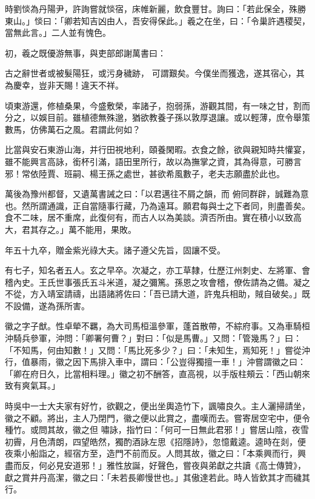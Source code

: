 \begin{pinyinscope}
 時劉惔為丹陽尹，許詢嘗就惔宿，床帷新麗，飲食豐甘。詢曰：「若此保全，殊勝東山。」惔曰：「卿若知吉凶由人，吾安得保此。」羲之在坐，曰：「令巢許遇稷契，當無此言。」二人並有愧色。



 初，羲之既優游無事，與吏部郎謝萬書曰：



 古之辭世者或被髮陽狂，或污身穢跡，
 可謂艱矣。今僕坐而獲逸，遂其宿心，其為慶幸，豈非天賜！違天不祥。



 頃東游還，修植桑果，今盛敷榮，率諸子，抱弱孫，游觀其間，有一味之甘，割而分之，以娛目前。雖植德無殊邈，猶欲教養子孫以敦厚退讓。或以輕薄，庶令舉策數馬，仿佛萬石之風。君謂此何如？



 比當與安石東游山海，并行田視地利，頤養閑暇。衣食之餘，欲與親知時共懽宴，雖不能興言高詠，銜杯引滿，語田里所行，故以為撫掌之資，其為得意，可勝言邪！常依陸賈、班嗣、楊王孫之處世，甚欲希風數子，老夫志願盡於此也。



 萬後為豫州都督，又遺萬書誡之曰：「以君邁往不屑之韻，而
 俯同群辟，誠難為意也。然所謂通識，正自當隨事行藏，乃為遠耳。願君每與士之下者同，則盡善矣。食不二味，居不重席，此復何有，而古人以為美談。濟否所由。實在積小以致高大，君其存之。」萬不能用，果敗。



 年五十九卒，贈金紫光祿大夫。諸子遵父先旨，固讓不受。



 有七子，知名者五人。玄之早卒。次凝之，亦工草隸，仕歷江州刺史、左將軍、會稽內史。王氏世事張氏五斗米道，凝之彌篤。孫恩之攻會稽，僚佐請為之備。凝之不從，方入靖室請禱，出語諸將佐曰：「吾已請大道，許鬼兵相助，賊自破矣。」既不設備，遂為孫所害。



 徽之字子猷。性卓犖不羈，為大司馬桓溫參軍，蓬首散帶，不綜府事。又為車騎桓沖騎兵參軍，沖問：「卿署何曹？」對曰：「似是馬曹。」又問：「管幾馬？」曰：「不知馬，何由知數！」又問：「馬比死多少？」曰：「未知生，焉知死！」嘗從沖行，值暴雨，徽之因下馬排入車中，謂曰：「公豈得獨擅一車！」沖嘗謂徽之曰：「卿在府日久，比當相料理。」徽之初不酬答，直高視，以手版柱頰云：「西山朝來致有爽氣耳。」



 時吳中一士大夫家有好竹，欲觀之，便出坐輿造竹下，諷嘯良久。主人灑掃請坐，徽之不顧。將出，主人乃閉門，徽之便以此賞之，盡嘆而去。嘗寄居空宅中，便令種竹。或問其故，徽之但
 嘯詠，指竹曰：「何可一日無此君邪！」嘗居山陰，夜雪初霽，月色清朗，四望皓然，獨酌酒詠左思《招隱詩》，忽憶戴逵。逵時在剡，便夜乘小船詣之，經宿方至，造門不前而反。人問其故，徽之曰：「本乘興而行，興盡而反，何必見安道邪！」雅性放誕，好聲色，嘗夜與弟獻之共讀《高士傳贊》，獻之賞井丹高潔，徽之曰：「未若長卿慢世也。」其傲達若此。時人皆欽其才而穢其行。




\end{pinyinscope}
